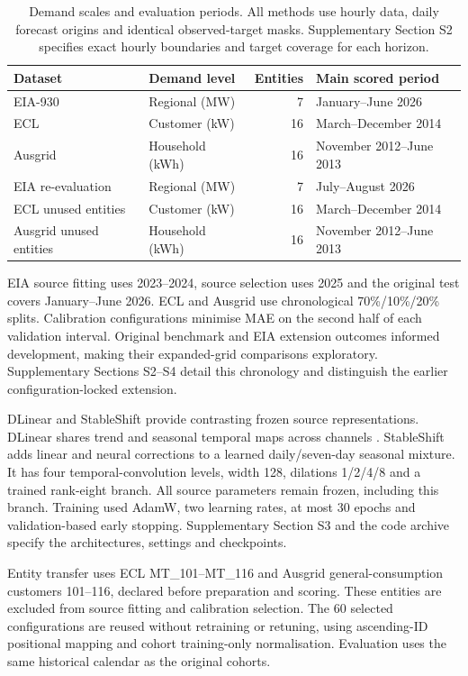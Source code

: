 \documentclass[preprint,12pt,times,nonatbib]{elsarticle}
\begin{document}
\begin{table}[!tbp]
\centering\small
\caption{Demand scales and evaluation periods. All methods use hourly data, daily forecast origins and identical observed-target masks. Supplementary Section S2 specifies exact hourly boundaries and target coverage for each horizon.}
\label{tab:datasets}
\begin{tabular}{llrl}
\toprule
Dataset & Demand level & Entities & Main scored period\\
\midrule
EIA-930 & Regional (MW) & 7 & January--June 2026\\
ECL & Customer (kW) & 16 & March--December 2014\\
Ausgrid & Household (kWh) & 16 & November 2012--June 2013\\
\midrule
EIA re-evaluation & Regional (MW) & 7 & July--August 2026\\
ECL unused entities & Customer (kW) & 16 & March--December 2014\\
Ausgrid unused entities & Household (kWh) & 16 & November 2012--June 2013\\
\bottomrule
\end{tabular}
\end{table}

EIA source fitting uses 2023--2024, source selection uses 2025 and the original test covers January--June 2026. ECL and Ausgrid use chronological 70\%/10\%/20\% splits. Calibration configurations minimise MAE on the second half of each validation interval. Original benchmark and EIA extension outcomes informed development, making their expanded-grid comparisons exploratory. Supplementary Sections S2--S4 detail this chronology and distinguish the earlier configuration-locked extension.

DLinear and StableShift provide contrasting frozen source representations. DLinear shares trend and seasonal temporal maps across channels \parencite{zeng2023transformers}. StableShift adds linear and neural corrections to a learned daily/seven-day seasonal mixture. It has four temporal-convolution levels, width 128, dilations 1/2/4/8 and a trained rank-eight branch. All source parameters remain frozen, including this branch. Training used AdamW, two learning rates, at most 30 epochs and validation-based early stopping. Supplementary Section S3 and the code archive specify the architectures, settings and checkpoints.

Entity transfer uses ECL MT\_101--MT\_116 and Ausgrid general-consumption customers 101--116, declared before preparation and scoring. These entities are excluded from source fitting and calibration selection. The 60 selected configurations are reused without retraining or retuning, using ascending-ID positional mapping and cohort training-only normalisation. Evaluation uses the same historical calendar as the original cohorts.
\end{document}
